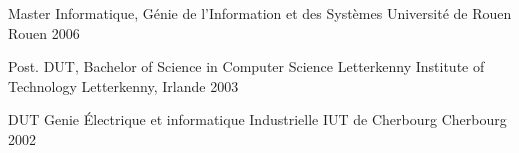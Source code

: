 

\begin{cventries}

   
  \cventry
    {Master  Informatique, Génie de l'Information et des Systèmes} %
    {Université de Rouen} %
    {Rouen} %
    {2006} %
  	{}
    
    
  \cventry
    {Post. DUT, Bachelor of Science in Computer Science} %
    {Letterkenny Institute of Technology} %
    {Letterkenny, Irlande} %
    {2003} %
  	{}


  \cventry
    {DUT Genie Électrique et informatique Industrielle} %
    {IUT de Cherbourg} %
    {Cherbourg} %
    {2002} %
  	{}

\end{cventries}
